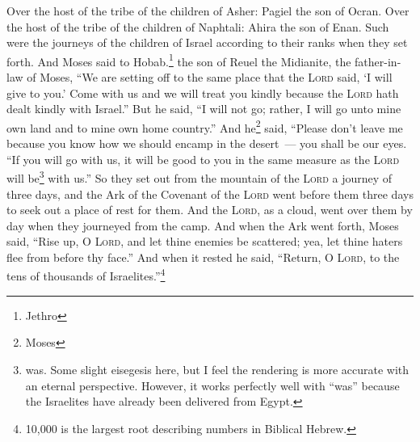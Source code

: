 \begin{enumerate}
     Over the host of the tribe of the children of Asher: Pagiel the son of Ocran.%
     Over the host of the tribe of the children of Naphtali: Ahira the son of Enan.%
     Such were the journeys of the children of Israel according to their ranks when they set forth.%
     And Moses said to Hobab.\footnote{Jethro} the son of Reuel the Midianite, the father-in-law of Moses, ``We are setting off to the same place that the \textsc{Lord} said, `I will give to you.' Come with us and we will treat you kindly because the \textsc{Lord} hath dealt kindly with Israel.''%
     But he said, ``I will not go; rather, I will go unto mine own land and to mine own home country.''%
     And he\footnote{Moses} said, ``Please don't leave me because you know how we should encamp in the desert~--- you shall be our eyes.%
     ``If you will go with us, it will be good to you in the same measure as the \textsc{Lord} will be\footnote{was. Some slight eisegesis here, but I feel the rendering is more accurate with an eternal perspective. However, it works perfectly well with ``was'' because the Israelites have already been delivered from Egypt.} with us.''%
     So they set out from the mountain of the \textsc{Lord} a journey of three days, and the Ark of the Covenant of the \textsc{Lord} went before them three days to seek out a place of rest for them.%
     And the \textsc{Lord}, as a cloud, went over them by day when they journeyed from the camp.%
     And when the Ark went forth, Moses said, ``Rise up, O \textsc{Lord}, and let thine enemies be scattered; yea, let thine haters flee from before thy face.''%
     And when it rested he said, ``Return, O \textsc{Lord}, to the tens of thousands of Israelites.''\footnote{10,000 is the largest root describing numbers in Biblical Hebrew.}%
\end{enumerate}
